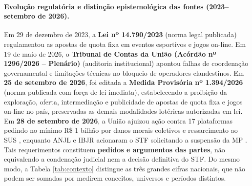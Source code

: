 \documentclass[10pt,a4paper]{article}
\begin{document}
\paragraph{Evolução regulatória e distinção epistemológica das fontes (2023--setembro de 2026).}
Em 29 de dezembro de 2023, a \textbf{Lei nº 14.790/2023} \cite{lei14790} (norma legal publicada) regulamentou as apostas de quota fixa em eventos esportivos e jogos on-line. Em 19 de maio de 2026, o \textbf{Tribunal de Contas da União (Acórdão nº 1296/2026 -- Plenário)} \cite{tcu2026} (auditoria institucional) apontou falhas de coordenação governamental e limitações técnicas no bloqueio de operadores clandestinos. Em \textbf{25 de setembro de 2026}, foi editada a \textbf{Medida Provisória nº 1.394/2026} \cite{mp1394,ms2026} (norma publicada com força de lei imediata), estabelecendo a proibição da exploração, oferta, intermediação e publicidade de apostas de quota fixa e jogos on-line no país, preservadas as demais modalidades lotéricas autorizadas em lei. Em \textbf{28 de setembro de 2026}, a União ajuizou ação contra 17 plataformas pedindo no mínimo R\$ 1 bilhão por danos morais coletivos e ressarcimento ao SUS \cite{richter2026}, enquanto ANJL e IBJR acionaram o STF solicitando a suspensão da MP \cite{pontes2026}. Tais requerimentos constituem \textbf{pedidos e argumentos das partes}, não equivalendo a condenação judicial nem a decisão definitiva do STF. Do mesmo modo, a Tabela \ref{tab:contexto} distingue as três grandes cifras nacionais, que não podem ser somadas por medirem conceitos, universos e períodos distintos.
\end{document}
